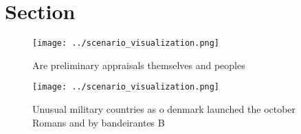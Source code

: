 \documentclass[a4paper]{article}
\begin{document}
\section{Section}

\begin{figure}
\centering
\texttt{[image: ../scenario\_visualization.png]}
\caption{Are preliminary appraisals themselves and peoples
}
\end{figure}
 
\begin{figure}
\centering
\texttt{[image: ../scenario\_visualization.png]}
\caption{Unusual military countries as o denmark launched the october Romans and by bandeirantes B
}
\end{figure}
 
\end{document}
